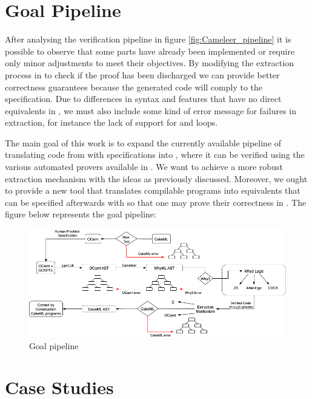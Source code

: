 \section{Goal Pipeline}

After analysing the verification pipeline in figure \ref{fig:Cameleer_pipeline} it is possible to observe that some parts have already been 
implemented or require only minor adjustments to meet their objectives. By modifying the extraction process in \whythree to check if the 
proof has been discharged we can provide better correctness guarantees because the generated \cml code will comply to the specification. 
Due to differences in syntax and features that have no direct equivalents in \cml, we must also include some kind of error message for 
failures in extraction, for instance the lack of support for  and  loops.

The main goal of this work is to expand the currently available pipeline of translating code from \ocaml with \gospel specifications 
into \whyml, where it can be verified using the various automated provers available in \whythree. We want to achieve 
a more robust extraction mechanism with the ideas as previously discussed. Moreover, we ought to provide a new tool that 
translates compilable \cml programs into \ocaml equivalents that can be specified afterwards with \gospel so that one may prove 
their correctness in \cameleer. The figure below represents the goal pipeline:

\begin{figure}[H]
    \centering
    \includegraphics[width=\linewidth]{images/Goal_Pipeline.png}
    \caption{Goal pipeline}
\end{figure}

\section{Case Studies}

